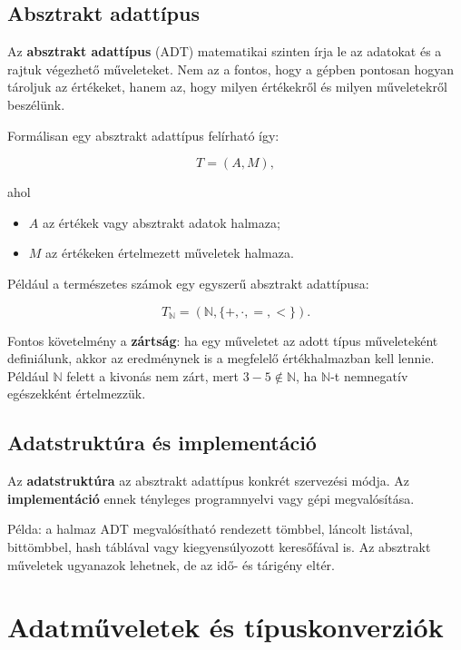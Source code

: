 \subsection{Absztrakt adattípus}

Az \textbf{absztrakt adattípus} (ADT) matematikai szinten írja le az adatokat és a rajtuk végezhető műveleteket. Nem az a fontos, hogy a gépben pontosan hogyan tároljuk az értékeket, hanem az, hogy milyen értékekről és milyen műveletekről beszélünk.

Formálisan egy absztrakt adattípus felírható így:

\[
T=(A,M),
\]

ahol

\begin{itemize}
  \item $A$ az értékek vagy absztrakt adatok halmaza;
  \item $M$ az értékeken értelmezett műveletek halmaza.
\end{itemize}

Például a természetes számok egy egyszerű absztrakt adattípusa:

\[
T_{\mathbb{N}}=(\mathbb{N},\{+,\cdot,=,<\}).
\]

Fontos követelmény a \textbf{zártság}: ha egy műveletet az adott típus műveleteként definiálunk, akkor az eredménynek is a megfelelő értékhalmazban kell lennie. Például $\mathbb{N}$ felett a kivonás nem zárt, mert $3-5\notin\mathbb{N}$, ha $\mathbb{N}$-t nemnegatív egészekként értelmezzük.

\subsection{Adatstruktúra és implementáció}

Az \textbf{adatstruktúra} az absztrakt adattípus konkrét szervezési módja. Az \textbf{implementáció} ennek tényleges programnyelvi vagy gépi megvalósítása.

\begin{center}

\end{center}

Példa: a halmaz ADT megvalósítható rendezett tömbbel, láncolt listával, bittömbbel, hash táblával vagy kiegyensúlyozott keresőfával is. Az absztrakt műveletek ugyanazok lehetnek, de az idő- és tárigény eltér.

\section{Adatműveletek és típuskonverziók}

